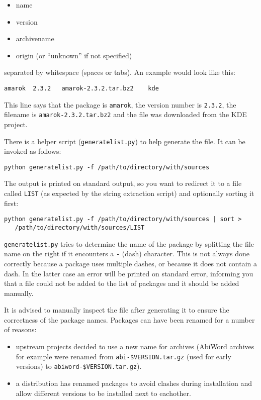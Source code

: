 \documentclass[10pt]{article}
\begin{document}
\begin{itemize}
\item name
\item version
\item archivename
\item origin (or ``unknown'' if not specified)
\end{itemize}

separated by whitespace (spaces or tabs). An example would look like this:

\begin{verbatim}
amarok	2.3.2	amarok-2.3.2.tar.bz2	kde
\end{verbatim}

This line says that the package is \texttt{amarok}, the version number is
\texttt{2.3.2}, the filename is \texttt{amarok-2.3.2.tar.bz2} and the file
was downloaded from the KDE project.

There is a helper script (\texttt{generatelist.py}) to help generate the file.
It can be invoked as follows:

\begin{verbatim}
python generatelist.py -f /path/to/directory/with/sources
\end{verbatim}

The output is printed on standard output, so you want to redirect it to a file
called \texttt{LIST} (as expected by the string extraction script) and
optionally sorting it first:

\begin{verbatim}
python generatelist.py -f /path/to/directory/with/sources | sort >
   /path/to/directory/with/sources/LIST
\end{verbatim}


\texttt{generatelist.py} tries to determine the name of the package by
splitting the file name on the right if it encounters a \texttt{-} (dash)
character. This is not always done correctly because a package uses multiple
dashes, or because it does not contain a dash. In the latter case an error
will be printed on standard error, informing you that a file could not be
added to the list of packages and it should be added manually.

It is advised to manually inspect the file after generating it to ensure the
correctness of the package names. Packages can have been renamed for a number
of reasons:

\begin{itemize}
\item upstream projects decided to use a new name for archives (AbiWord
archives for example were renamed from \texttt{abi-\$VERSION.tar.gz} (used for
early versions) to \texttt{abiword-\$VERSION.tar.gz}).
\item a distribution has renamed packages to avoid clashes during installation
and allow different versions to be installed next to eachother.
\end{itemize}
\end{document}
